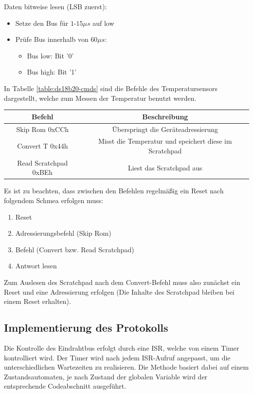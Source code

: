 \documentclass
[ 12pt,
  parskip=half %
]{scrreprt}
\begin{document}
Daten bitweise lesen (LSB zuerst):
\begin{itemize}
	\item Setze den Bus für $1$-$15 \mu{s}$ auf low
	\item Prüfe Bus innerhalb von $60 \mu{s}$:
	\begin{itemize}
		\item Bus low: Bit '0'
		\item Bus high: Bit '1'
	\end{itemize}
\end{itemize}

In Tabelle \ref{table:ds18b20-cmds} sind die Befehle des Temperatursensors dargestellt, welche zum Messen der Temperatur benutzt werden.

\begin{center}
	\begin{tabulary}{\columnwidth}{|C|C|}
		\hline
		\textbf{Befehl} & \textbf{Beschreibung}\\
		\hline
		Skip Rom 0xCCh & Überspringt die Geräteadressierung\\
		\hline
		Convert T 0x44h & Misst die Temperatur und speichert diese im Scratchpad\\
		\hline
		Read Scratchpad 0xBEh & Liest das Scratchpad aus\\
		\hline
	\end{tabulary}
	\label{table:ds18b20-cmds}
\end{center}

Es ist zu beachten, dass zwischen den Befehlen regelmäßig ein Reset nach folgendem Schmea erfolgen muss: 
\begin{enumerate}
	\item Reset
	\item Adressierungsbefehl (Skip Rom)
	\item Befehl (Convert bzw. Read Scratchpad)
	\item Antwort lesen
\end{enumerate}

Zum Auslesen des Scratchpad nach dem Convert-Befehl muss also zunächst ein Reset und eine Adressierung erfolgen (Die Inhalte des Scratchpad bleiben bei einem Reset erhalten).

\subsection{Implementierung des Protokolls}

Die Kontrolle des Eindrahtbus erfolgt durch eine ISR, welche von einem Timer kontrolliert wird. Der Timer wird nach jedem ISR-Aufruf angepasst, um die unterschiedlichen Wartezeiten zu realisieren. Die Methode basiert dabei auf einem Zustandsautomaten, je nach Zustand der globalen Variable  wird der entsprechende Codeabschnitt ausgeführt.
\end{document}
